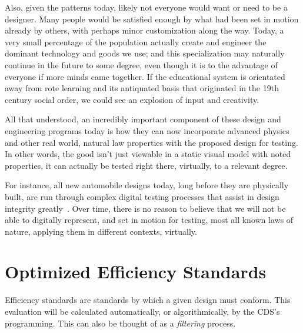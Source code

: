 \documentclass[10pt, a4paper, cleardoubleempty, openright, twoside]{book}
\begin{document}
Also, given the patterns today, likely not everyone would want or need
to be a designer. Many people would be satisfied enough by what had been
set in motion already by others, with perhaps minor customization along
the way. Today, a very small percentage of the population actually
create and engineer the dominant technology and goods we use; and this
specialization may naturally continue in the future to some degree, even
though it is to the advantage of everyone if more minds came together.
If the educational system is orientated away from rote learning and its
antiquated basis that originated in the 19th century social order, we
could see an explosion of input and creativity.

All that understood, an incredibly important component of these design
and engineering programs today is how they can now incorporate advanced
physics and other real world, natural law properties with the proposed
design for testing. In other words, the good isn't just viewable in a
static visual model with noted properties, it can actually be tested
right there, virtually, to a relevant degree.

For instance, all new automobile designs today, long before they are
physically built, are run through complex digital testing processes that
assist in design integrity greatly~\cite{Keenan:http:95}. Over time,
there is no reason to believe that we will not be able to digitally
represent, and set in motion for testing, most all known laws of nature,
applying them in different contexts, virtually.

\section {Optimized Efficiency Standards}

Efficiency standards are standards by which a given design must conform.
This evaluation will be calculated automatically, or algorithmically, by
the CDS's programming. This can also be thought of as a \emph{filtering}
process.
\end{document}
